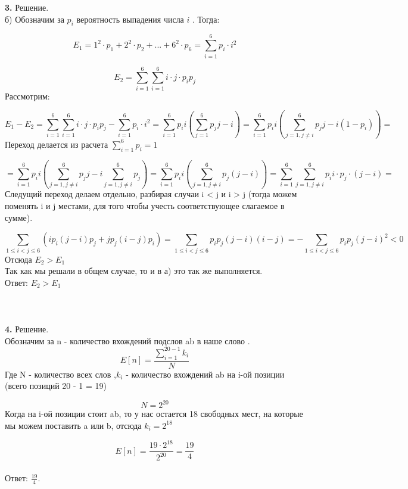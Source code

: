 \documentclass[12pt,a4paper]{scrartcl}
\begin{document}
\noindent \textbf{3.}
Решение.\\
б) Обозначим за $p_i$  вероятность выпадения числа $i$ . Тогда:

$$
E_1 
= 1^2 \cdot p_1 + 2^2 \cdot p_2+ ... + 6^2 \cdot p_6 
= \sum_{i = 1}^{6} p_i \cdot i^2
$$

$$
E_2 
= \sum_{i = 1}^{6} \sum_{i = 1}^{6} i \cdot j \cdot p_i p_j  
$$
Рассмотрим:

$$
E_1 - E_2 =
 \sum_{i = 1}^{6} \sum_{i = 1}^{6} i \cdot j \cdot p_i p_j - \sum_{i = 1}^{6} p_i \cdot i^2 
= \sum_{i = 1}^{6} p_i i (\sum_{j = 1}^{6} p_j j  - i) 
= \sum_{i = 1}^{6} p_i i (\sum_{j = 1,  j \neq i}^{6} p_j j - i(1 - p_i)) 
= 
$$
Переход делается из расчета $\sum\limits_{i = 1}^{6} p_i = 1$

$$ 
= \sum_{i = 1}^{6} p_i i (\sum_{j = 1,  j \neq i}^{6} p_j j - i\sum_{j = 1,  j \neq i}^{6} p_j) = \sum_{i = 1}^{6} p_i i (\sum_{j = 1,  j \neq i}^{6} p_j (j - i)) 
= \sum_{i = 1}^{6} \sum_{j = 1,  j \neq i}^{6} p_i i \cdot p_j \cdot (j - i) 
=
$$
Следущий переход делаем отдельно, разбирая случаи  i < j и i > j (тогда можем поменять i и j местами, для того чтобы учесть соответствующее слагаемое в сумме).

$$
\sum_{1 \leq i < j \leq 6}^{}(ip_i (j - i) p_j + jp_j (i - j)p_i) 
= \sum_{1 \leq i < j \leq 6}^{}p_i p_j (j - i)(i - j) 
= -\sum_{1 \leq i < j \leq 6}^{}p_i p_j (j - i)^2 < 0
$$
Отсюда $E_2 > E_1$\\
Так как мы решали в общем случае, то и в а) это так же выполняется.
\\ Ответ:  $E_2 > E_1$ 
\\ \\ \\ \\



\noindent \textbf{4.}
Решение.\\
Обозначим за n - количество вхождений подслов ab в наше слово
.
$$
E[n] 
= \frac{\sum\limits_{i = 1}^{20 - 1} k_i}{N}
$$
Где N - количество всех слов ,$k_i$ - количество вхождений  ab на i-ой позиции (всего позиций 20 - 1 = 19)

$$ N = 2^{20} $$
Когда на i-ой позиции стоит ab, то у нас остается 18 свободных мест, на которые мы можем поставить a или b, отсюда $k_i = 2^{18}$

$$
E[n] 
= \frac{19 \cdot 2^{18}}{2^{20}} 
= \frac{19}{4}
$$
\\ Ответ: $\frac{19}{4}$.
\\ \\ \\ \\
\end{document}
